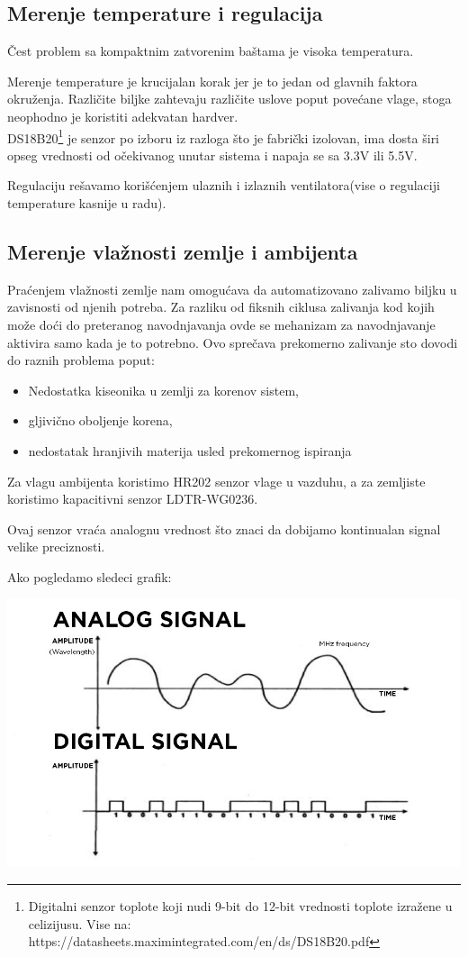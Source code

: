 \documentclass[a4paper,11pt]{book}
\begin{document}
\subsection{Merenje temperature i regulacija}

Čest problem sa kompaktnim zatvorenim baštama je visoka temperatura.

Merenje temperature je krucijalan korak jer je to jedan od glavnih faktora okruženja. Različite biljke zahtevaju različite uslove poput povećane vlage, stoga neophodno je koristiti adekvatan hardver.\\ 

\noindent DS18B20\footnote{Digitalni senzor toplote koji nudi 9-bit do 12-bit vrednosti toplote izražene u celizijusu. Vise na: https://datasheets.maximintegrated.com/en/ds/DS18B20.pdf} je senzor po izboru iz razloga što je fabrički izolovan, ima dosta širi opseg vrednosti od očekivanog unutar sistema i napaja se sa 3.3V ili 5.5V.

Regulaciju rešavamo korišćenjem ulaznih i izlaznih ventilatora(vise o regulaciji temperature kasnije u radu).

\subsection{Merenje vlažnosti zemlje i ambijenta}
Praćenjem vlažnosti zemlje nam omogućava da automatizovano zalivamo biljku u zavisnosti od njenih potreba. Za razliku od fiksnih ciklusa zalivanja kod kojih može doći do preteranog navodnjavanja ovde se mehanizam za navodnjavanje aktivira samo kada je to potrebno. Ovo sprečava prekomerno zalivanje sto dovodi do raznih problema poput:

\begin{itemize}
  \item Nedostatka kiseonika u zemlji za korenov sistem,
  \item gljivično oboljenje korena,
  \item nedostatak hranjivih materija usled prekomernog ispiranja
\end{itemize}

Za vlagu ambijenta koristimo HR202 senzor vlage u vazduhu, a za zemljiste koristimo kapacitivni senzor LDTR-WG0236.

Ovaj senzor vraća analognu vrednost što znaci da dobijamo kontinualan signal velike preciznosti. 

Ako pogledamo sledeci grafik:

\includegraphics[width=\textwidth]{digital-analog.jpg}
\end{document}
